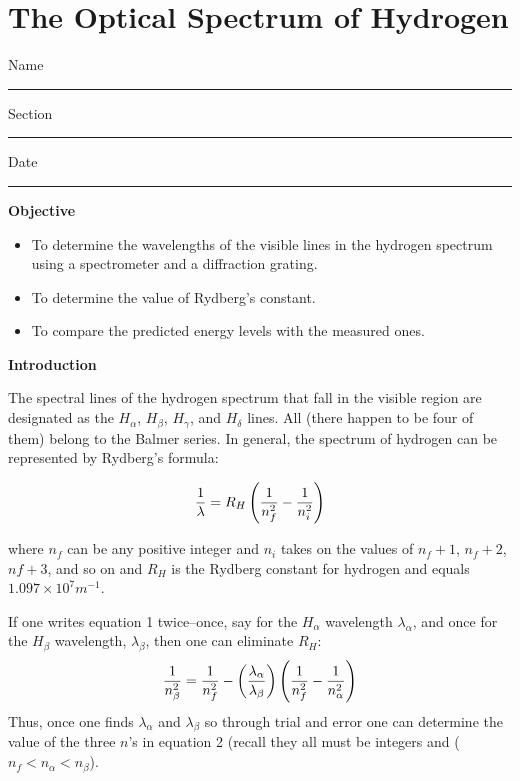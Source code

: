 

\section{The Optical Spectrum of Hydrogen}

Name \rule{2.0in}{0.1pt}\hfill{}Section \rule{1.0in}{0.1pt}\hfill{}Date
\rule{1.0in}{0.1pt}


\textbf{Objective}

\begin{itemize}

\item To determine the wavelengths of the visible lines in the hydrogen spectrum using         
a spectrometer and a diffraction grating.

\item To determine the value of Rydberg's constant.

\item To compare the predicted energy levels with the measured ones.

\end{itemize}

\textbf{Introduction}

\bigskip
 
The spectral lines of the hydrogen spectrum that fall in the visible region are designated as 
the $H_\alpha$, 
$H_\beta$, $H_\gamma$, and $H_\delta$  lines.  
All (there happen to be four of them) belong to the Balmer series.  
In general, the spectrum of hydrogen can be represented by Rydberg's formula:

\begin{equation}
{1 \over \lambda} = R_H \left ( {1 \over n_f^2} - {1 \over n_i^2} \right )
\end{equation}

\noindent where $n_f$ can be any positive integer and $n_i$ takes on the values of $n_f + 1$, $n_f + 2$, 
$nf + 3$, and so on and $R_H$ is the Rydberg constant for hydrogen and equals $1.097 \times 10^7 m^{-1}$.

If one writes equation 1 twice--once, say for the $H_\alpha$ wavelength $\lambda_\alpha$, 
and once for the $H_\beta$ wavelength, $\lambda_\beta$, then one can eliminate $R_H$:
\begin{equation}
{1 \over {n_\beta^2}} = {1 \over n_f^2} - \left ( {\lambda_\alpha \over \lambda_\beta} \right )
   \left ( {1 \over n_f^2} - {1 \over n_\alpha^2} \right )
\end{equation}
Thus, once one finds $\lambda_\alpha$ and $\lambda_\beta$ so through trial and error one can
determine the value of the three $n$'s in equation 2 (recall they all must be integers and 
($n_f < n_\alpha < n_\beta$).

